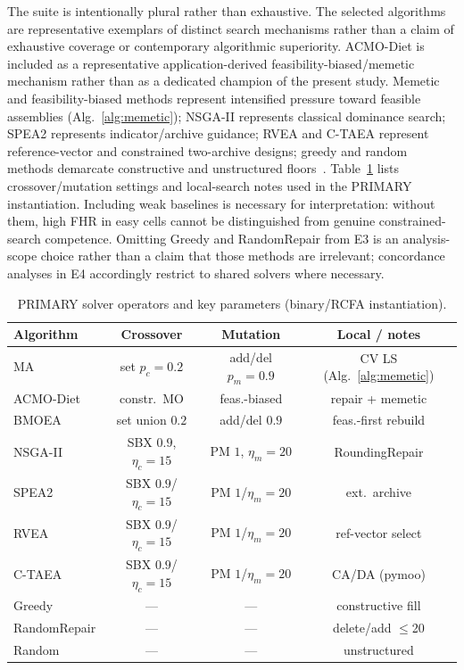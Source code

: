 \documentclass[lettersize,journal]{IEEEtran}
\begin{document}
The suite is intentionally plural rather than exhaustive.
The selected algorithms are representative exemplars of distinct search mechanisms rather than a claim of exhaustive coverage or contemporary algorithmic superiority. ACMO-Diet is included as a representative application-derived feasibility-biased/memetic mechanism rather than as a dedicated champion of the present study.
Memetic and feasibility-biased methods represent intensified pressure toward feasible assemblies (Alg.~\ref{alg:memetic}); NSGA-II represents classical dominance search; SPEA2 represents indicator/archive guidance; RVEA and C-TAEA represent reference-vector and constrained two-archive designs; greedy and random methods demarcate constructive and unstructured floors~\cite{zhao2025acmodiet,deb2002,zitzler2001,cheng2016,li2019ctaea}.
Table~\ref{tab:params} lists crossover/mutation settings and local-search notes used in the PRIMARY instantiation.
Including weak baselines is necessary for interpretation: without them, high FHR in easy cells cannot be distinguished from genuine constrained-search competence.
Omitting Greedy and RandomRepair from E3 is an analysis-scope choice rather than a claim that those methods are irrelevant; concordance analyses in E4 accordingly restrict to shared solvers where necessary.

\begin{table}[!t]
\centering
\caption{PRIMARY solver operators and key parameters (binary/RCFA instantiation).}
\label{tab:params}
\scriptsize
\setlength{\tabcolsep}{2pt}
\begin{tabular}{@{}l@{\,}c@{\,}c@{\,}c@{}}
\toprule
Algorithm & Crossover & Mutation & Local / notes \\
\midrule
MA & set $p_c{=}0.2$ & add/del $p_m{=}0.9$ & CV LS (Alg.~\ref{alg:memetic}) \\
ACMO-Diet~\cite{zhao2025acmodiet} & constr.\ MO & feas.-biased & repair + memetic \\
BMOEA & set union $0.2$ & add/del $0.9$ & feas.-first rebuild \\
NSGA-II~\cite{deb2002} & SBX $0.9$, $\eta_c{=}15$ & PM $1$, $\eta_m{=}20$ & RoundingRepair \\
SPEA2~\cite{zitzler2001} & SBX $0.9$/$\eta_c{=}15$ & PM $1$/$\eta_m{=}20$ & ext.\ archive \\
RVEA~\cite{cheng2016} & SBX $0.9$/$\eta_c{=}15$ & PM $1$/$\eta_m{=}20$ & ref-vector select \\
C-TAEA~\cite{li2019ctaea} & SBX $0.9$/$\eta_c{=}15$ & PM $1$/$\eta_m{=}20$ & CA/DA (pymoo) \\
Greedy & --- & --- & constructive fill \\
RandomRepair & --- & --- & delete/add $\le$20 \\
Random & --- & --- & unstructured \\
\bottomrule
\end{tabular}
\end{table}
\end{document}
